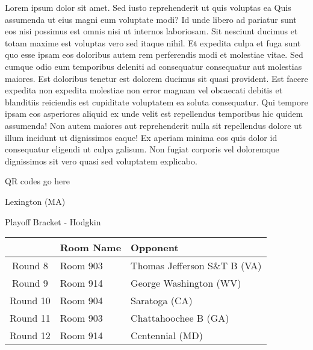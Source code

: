 \documentclass{article}%
\begin{document}
\vspace*{8pt}%
\linebreak%
\newline%
\newline%
Lorem ipsum dolor sit amet. Sed iusto reprehenderit ut quis voluptas ea Quis assumenda ut eius magni eum voluptate modi? Id unde libero ad pariatur sunt eos nisi possimus est omnis nisi ut internos laboriosam. Sit nesciunt ducimus et totam maxime est voluptas vero sed itaque nihil. Et expedita culpa et fuga sunt quo esse ipsam eos doloribus autem rem perferendis modi et molestiae vitae.\newline%
\newline%
Sed cumque odio eum temporibus deleniti ad consequatur consequatur aut molestias maiores. Est doloribus tenetur est dolorem ducimus sit quasi provident. Est facere expedita non expedita molestiae non error magnam vel obcaecati debitis et blanditiis reiciendis est cupiditate voluptatem ea soluta consequatur. Qui tempore ipsam eos asperiores aliquid ex unde velit est repellendus temporibus hic quidem assumenda!\newline%
\newline%
Non autem maiores aut reprehenderit nulla sit repellendus dolore ut illum incidunt ut dignissimos eaque! Ex aperiam minima eos quis dolor id consequatur eligendi ut culpa galisum. Non fugiat corporis vel doloremque dignissimos sit vero quasi sed voluptatem explicabo.\newline%
\newline%
%
\vspace*{30pt}%
\begin{center}%
\begin{Huge}%
QR codes go here%
\end{Huge}%
\end{center}%
\newpage%
\begin{center}%
\begin{Huge}%
Lexington (MA)%
\end{Huge}%
\vspace*{8pt}%
\linebreak%
\begin{Large}%
Playoff Bracket {-} Hodgkin%
\end{Large}%
\end{center}%
%
\begin{tabularx}{\textwidth}{|c|Y|Y|}%
\hline%
&Room Name&Opponent\\%
\hline%
Round 8&Room 903&Thomas Jefferson S\&T B (VA)\\%
Round 9&Room 914&George Washington (WV)\\%
Round 10&Room 904&Saratoga (CA)\\%
Round 11&Room 903&Chattahoochee B (GA)\\%
Round 12&Room 914&Centennial (MD)\\%
\hline%
\end{tabularx}%
\end{document}
